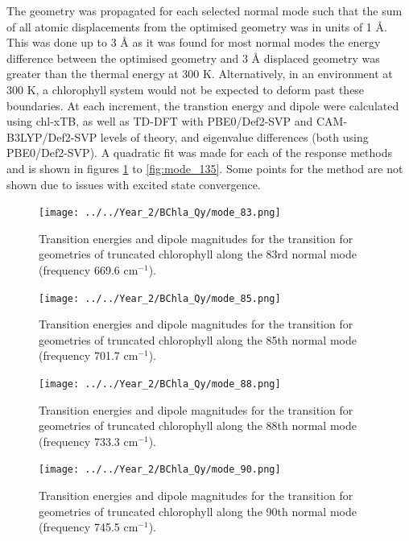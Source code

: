 The geometry was propagated for each selected normal mode such that the sum of
all atomic displacements from the optimised geometry was in units of 1 \AA{}.
This was done up to 3 \AA{} as it was found for most normal modes the energy 
difference between the optimised geometry and 3 \AA{} displaced geometry was greater
than the thermal energy at 300 K. Alternatively, in an environment at 300 K, a chlorophyll 
system would not be expected to deform past these boundaries. At each increment,
the \Qy transtion energy and dipole were calculated using chl-xTB, as well as TD-DFT
with PBE0/Def2-SVP and CAM-B3LYP/Def2-SVP levels of theory, \dscf and eigenvalue 
differences (both using PBE0/Def2-SVP). A quadratic fit was made for each of the
response methods and is shown in figures \ref{fig:mode_83} to \ref{fig:mode_135}. 
Some points for the \dscf method are not shown due to issues with excited state 
convergence.

\begin{figure}
    \centering
    \texttt{[image: ../../Year\_2/BChla\_Qy/mode\_83.png]}
    \caption{Transition energies and dipole magnitudes for the \Qy transition for
    geometries of truncated chlorophyll along the 83rd normal mode (frequency 669.6
    $\text{cm}^{-1}$).}
    \label{fig:mode_83}
\end{figure}

\begin{figure}
    \centering
    \texttt{[image: ../../Year\_2/BChla\_Qy/mode\_85.png]}
    \caption{Transition energies and dipole magnitudes for the \Qy transition for
    geometries of truncated chlorophyll along the 85th normal mode (frequency 701.7
    $\text{cm}^{-1}$).}
    \label{fig:mode_85}
\end{figure}

\begin{figure}
    \centering
    \texttt{[image: ../../Year\_2/BChla\_Qy/mode\_88.png]}
    \caption{Transition energies and dipole magnitudes for the \Qy transition for
    geometries of truncated chlorophyll along the 88th normal mode (frequency 733.3
    $\text{cm}^{-1}$).}
    \label{fig:mode_88}
\end{figure}

\begin{figure}
    \centering
    \texttt{[image: ../../Year\_2/BChla\_Qy/mode\_90.png]}
    \caption{Transition energies and dipole magnitudes for the \Qy transition for
    geometries of truncated chlorophyll along the 90th normal mode (frequency 745.5
    $\text{cm}^{-1}$).}
    \label{fig:mode_90}
\end{figure}

